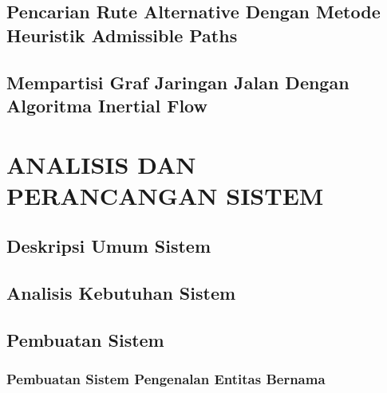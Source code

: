 \documentclass[ugmskripsi]{ugmskripsi}
\begin{document}
     \section{Pencarian Rute Alternative Dengan Metode Heuristik Admissible Paths}
    \label{alternative-routes}
    

    \section{Mempartisi Graf Jaringan Jalan Dengan Algoritma Inertial Flow}
    \label{alternative-routes}
    


\chapter{ANALISIS DAN PERANCANGAN SISTEM}
\label{ANALISIS DAN PERANCANGAN SISTEM}

	\section{Deskripsi Umum Sistem}
	\label{rancangan deskripsi umum sistem}
	

	\section{Analisis Kebutuhan Sistem}
	\label{rancangan analisis kebutuhan sistem}
	

	\section{Pembuatan Sistem}
	\label{rancangan pembuatan sistem}

		\subsection{Pembuatan Sistem Pengenalan Entitas Bernama}
		\label{rancangan pembuatan sistem pengenalan entitas bernama}
		
\end{document}
